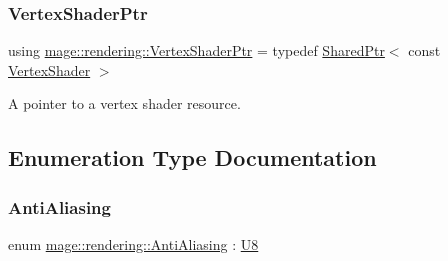 \subsubsection{\texorpdfstring{Vertex\+Shader\+Ptr}{VertexShaderPtr}}
{\footnotesize\ttfamily using \mbox{\hyperlink{namespacemage_1_1rendering_aaf704b9c54a4181f4950a1761de69dda}{mage\+::rendering\+::\+Vertex\+Shader\+Ptr}} = typedef \mbox{\hyperlink{namespacemage_a1e01ae66713838a7a67d30e44c67703e}{Shared\+Ptr}}$<$ const \mbox{\hyperlink{classmage_1_1rendering_1_1_vertex_shader}{Vertex\+Shader}} $>$}

A pointer to a vertex shader resource. 

\subsection{Enumeration Type Documentation}
\mbox{\label{namespacemage_1_1rendering_ac3f75e49e92b42f2f5fb55c450d8899c}} 
\subsubsection{\texorpdfstring{Anti\+Aliasing}{AntiAliasing}}
{\footnotesize\ttfamily enum \mbox{\hyperlink{namespacemage_1_1rendering_ac3f75e49e92b42f2f5fb55c450d8899c}{mage\+::rendering\+::\+Anti\+Aliasing}} \+: \mbox{\hyperlink{namespacemage_a30677c03d683c4c35630c25f6ff3fb7f}{U8}}\hspace{0.3cm}{\ttfamily [strong]}}

